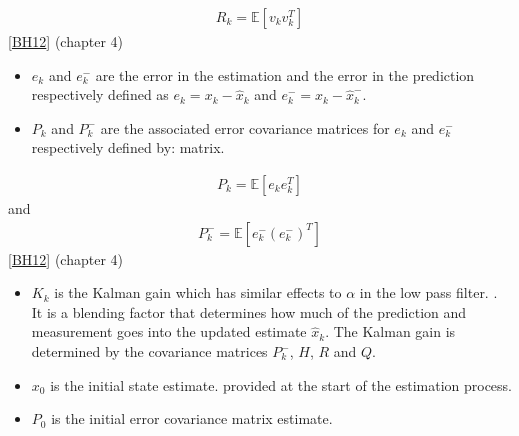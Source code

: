 \documentclass[letterpaper,10pt,english]{jupyterBook}
\begin{document}
\begin{equation}\label{equation:2KalmanFilters:eq-measurement-noise-cov}
\begin{split}R_k = \mathbb{E}[v_k v_k^T]\end{split}
\end{equation}
\sphinxAtStartPar
{[}\hyperlink{cite.99Bibliography:id2}{BH12}{]} (chapter 4)
\begin{itemize}
\item {} 
\sphinxAtStartPar
\(e_k\) and \(e^-_k\) are the error in the estimation and the error in the prediction respectively defined as \(e_k = x_k-\hat{x}_k\) and \(e^-_k = x_k-\hat{x}^-_k\). 

\item {} 
\sphinxAtStartPar
\(P_k\) and \(P^-_k\) are the associated error covariance matrices for \(e_k\) and \(e^-_k\) respectively defined by:  matrix.

\end{itemize}
\begin{equation}\label{equation:2KalmanFilters:eq-estimation-cov}
\begin{split}P_k = \mathbb{E}[e_k e_k^T]\end{split}
\end{equation}
\sphinxAtStartPar
and
\begin{equation}\label{equation:2KalmanFilters:eq-prediction-cov}
\begin{split}P^-_k = \mathbb{E}[e^-_k (e^-_k)^T]\end{split}
\end{equation}
\sphinxAtStartPar
{[}\hyperlink{cite.99Bibliography:id2}{BH12}{]} (chapter 4)
\begin{itemize}
\item {} 
\sphinxAtStartPar
\(K_k\) is the Kalman gain which has similar effects to \(\alpha\) in the low pass filter. . It is a blending factor that determines how much of the prediction and measurement goes into the updated estimate \(\hat{x}_k\). The Kalman gain is determined by the covariance matrices \(P^-_k\), \(H\), \(R\) and \(Q\).

\item {} 
\sphinxAtStartPar
\(x_0\) is the initial state estimate. provided at the start of the estimation process.

\item {} 
\sphinxAtStartPar
\(P_0\) is the initial error covariance matrix estimate.

\end{itemize}
\end{document}
